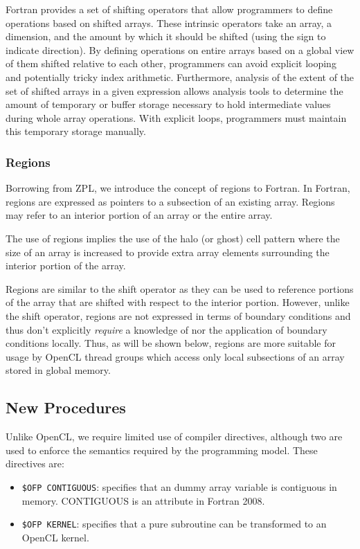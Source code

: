 Fortran provides a set of shifting operators that allow programmers to
define operations based on shifted arrays.  These intrinsic operators take
an array, a dimension, and the amount by which it should be shifted (using
the sign to indicate direction).  By defining operations on entire arrays
based on a global view of them shifted relative to each other, programmers can
avoid explicit looping and potentially tricky index arithmetic.  Furthermore,
analysis of the extent of the set of shifted arrays in a given expression
allows analysis tools to determine the amount of temporary or buffer storage
necessary to hold intermediate values during whole array operations.  With
explicit loops, programmers must maintain this temporary storage manually.

\subsubsection*{Regions}

Borrowing from ZPL, we introduce the concept of regions to Fortran.  In
Fortran, regions are expressed as pointers to a subsection of an existing array.
Regions may refer to an interior portion of an array or the entire array.

The use of regions implies the use of the halo (or ghost) cell pattern 
where the size of an array is increased to provide extra array elements
surrounding the interior portion of the array.  

Regions are similar to the shift operator as they can be used to reference
portions of the array that are shifted with respect to the interior portion.
However, unlike the shift operator, regions are not expressed in terms of
boundary conditions and thus don't explicitly \emph{require} a knowledge of
nor the application of boundary conditions locally.  Thus, as will be shown
below, regions are more suitable for usage by OpenCL thread groups which
access only local subsections of an array stored in global memory.

\subsection{New Procedures}

Unlike OpenCL, we require limited use of compiler directives, although
two are used to enforce the semantics required by the programming
model.  These directives are:

\begin{itemize}

\item {\tt \!\$OFP CONTIGUOUS}: specifies that an dummy array variable is
  contiguous in memory. CONTIGUOUS is an attribute in Fortran 2008.

\item {\tt \!\$OFP KERNEL}: specifies that a pure subroutine can be
  transformed to an OpenCL kernel.

\end{itemize}

